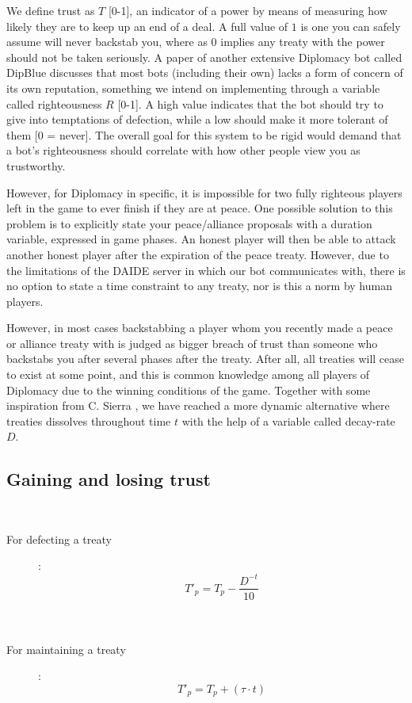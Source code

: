 \documentclass[a4paper]{article} %
\begin{document}
We define trust as $T$ [0-1], an indicator of a power by means of measuring how likely they are to keep up an end of a deal. A full value of $1$ is one you can safely assume will never backstab you, where as $0$ implies any treaty with the power should not be taken seriously. A paper of another extensive Diplomacy bot called DipBlue \cite{dipblue} discusses that most bots (including their own) lacks a form of concern of its own reputation, something we intend on implementing through a variable called righteousness $R$ [0-1]. A high value indicates that the bot should try to give into temptations of defection, while a low should make it more tolerant of them [0 = never]. The overall goal for this system to be rigid would demand that a bot's righteousness should correlate with how other people view you as trustworthy.

However, for Diplomacy in specific, it is impossible for two fully righteous players left in the game to ever finish if they are at peace. One possible solution to this problem is to explicitly state your peace/alliance proposals with a duration variable, expressed in game phases. An honest player will then be able to attack another honest player after the expiration of the peace treaty. However, due to the limitations of the DAIDE server in which our bot communicates with, there is no option to state a time constraint to any treaty, nor is this a norm by human players.

However, in most cases backstabbing a player whom you recently made a peace or alliance treaty with is judged as bigger breach of trust than someone who backstabs you after several phases after the treaty. After all, all treaties will cease to exist at some point, and this is common knowledge among all players of Diplomacy due to the winning conditions of the game. Together with some inspiration from C. Sierra \cite{trust}, we have reached a more dynamic alternative where treaties dissolves throughout time $t$ with the help of a variable called decay-rate $D$.

\subsection{Gaining and losing trust}
\
\begin{description}
\item[For defecting a treaty]: 
$$T'_p = T_p - \frac{D^{-t}} {10}$$ \\
\
\item[For maintaining a treaty]: 
$$T'_p = T_p + (\tau \cdot t)$$
\end{description}
\end{document}

